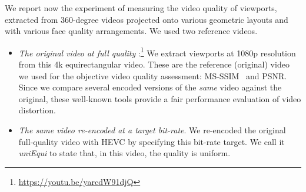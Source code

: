 We report now the experiment of measuring the video quality of
viewports, extracted from 360-degree videos
projected onto various geometric layouts and with various face quality
arrangements. We used two reference videos.
\begin{itemize}[leftmargin=7pt, itemindent=0pt, topsep=2pt, itemsep=-3pt]

   \item \emph{The original video at full quality}%
   :\footnote{\url{https://youtu.be/yarcdW91djQ}} 
	We extract viewports at 1080p resolution from this 4k
   equirectangular video. These are the reference (original)
   video we used for the objective video quality assessment:
   \ac{MS-SSIM}~\cite{wang2003multiscale} and
   \ac{PSNR}. 
   Since we
   compare several encoded versions of the \emph{same} video against the
   original, these well-known tools provide a fair performance evaluation of video distortion.

   \item \emph{The same video re-encoded at a target bit-rate}. 
   We re-encoded the original full-quality video with \ac{HEVC}
   by specifying this bit-rate target. We call it \emph{uniEqui} to
   state that, in this video, the quality is uniform.
\end{itemize}


